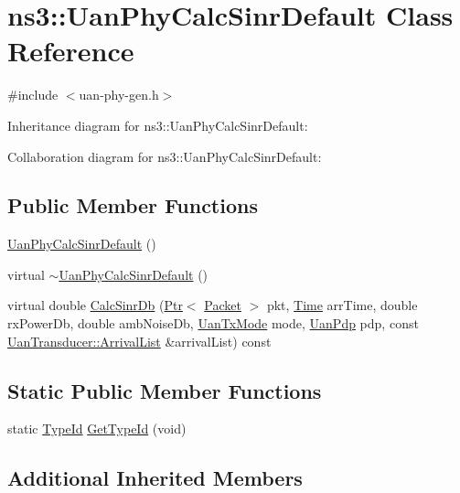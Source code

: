 \hypertarget{classns3_1_1UanPhyCalcSinrDefault}{}\section{ns3\+:\+:Uan\+Phy\+Calc\+Sinr\+Default Class Reference}
\label{classns3_1_1UanPhyCalcSinrDefault}


{\ttfamily \#include $<$uan-\/phy-\/gen.\+h$>$}



Inheritance diagram for ns3\+:\+:Uan\+Phy\+Calc\+Sinr\+Default\+:


Collaboration diagram for ns3\+:\+:Uan\+Phy\+Calc\+Sinr\+Default\+:
\subsection*{Public Member Functions}
\begin{DoxyCompactItemize}
\item 
\hyperlink{classns3_1_1UanPhyCalcSinrDefault_a32154a52d903811b8f44a45e305344ab}{Uan\+Phy\+Calc\+Sinr\+Default} ()
\item 
virtual \hyperlink{classns3_1_1UanPhyCalcSinrDefault_accf601da89aad40b76fc3bba73df56e0}{$\sim$\+Uan\+Phy\+Calc\+Sinr\+Default} ()
\item 
virtual double \hyperlink{classns3_1_1UanPhyCalcSinrDefault_ab31a349cd64cb9f09013b79580b67353}{Calc\+Sinr\+Db} (\hyperlink{classns3_1_1Ptr}{Ptr}$<$ \hyperlink{classns3_1_1Packet}{Packet} $>$ pkt, \hyperlink{classns3_1_1Time}{Time} arr\+Time, double rx\+Power\+Db, double amb\+Noise\+Db, \hyperlink{classns3_1_1UanTxMode}{Uan\+Tx\+Mode} mode, \hyperlink{classns3_1_1UanPdp}{Uan\+Pdp} pdp, const \hyperlink{classns3_1_1UanTransducer_a95332a21e30506421a116d4b5c4dfd75}{Uan\+Transducer\+::\+Arrival\+List} \&arrival\+List) const 
\end{DoxyCompactItemize}
\subsection*{Static Public Member Functions}
\begin{DoxyCompactItemize}
\item 
static \hyperlink{classns3_1_1TypeId}{Type\+Id} \hyperlink{classns3_1_1UanPhyCalcSinrDefault_a47a0da40bf35ca64ccc2e71174f7a220}{Get\+Type\+Id} (void)
\end{DoxyCompactItemize}
\subsection*{Additional Inherited Members}


